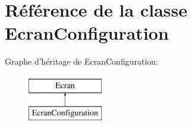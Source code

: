 \hypertarget{classEcranConfiguration}{\section{\-Référence de la classe \-Ecran\-Configuration}
\label{classEcranConfiguration}
}
\-Graphe d'héritage de \-Ecran\-Configuration\-:\begin{figure}[H]
\begin{center}
\leavevmode
\includegraphics[height=2.000000cm]{classEcranConfiguration}
\end{center}
\end{figure}
